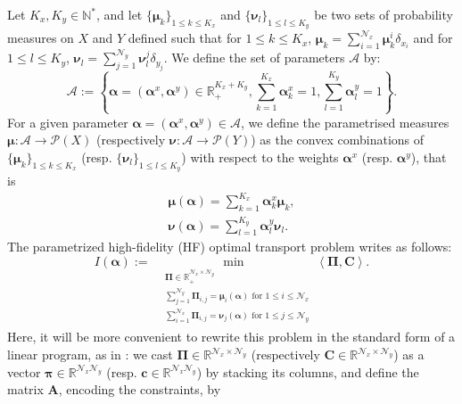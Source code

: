 \documentclass{article}
\def\RR{\mathbb{R}}
\def\N{\mathbb{N}}
\def\cA{\mathcal{A}}
\def\cN{\mathcal{N}}
\def\aalpha{\boldsymbol{\alpha}}
\def\ppi{\boldsymbol{\pi}}
\def\PPi{\boldsymbol{\Pi}}
\def\mmu{\boldsymbol{\mu}}
\def\nnu{\boldsymbol{\nu}}
\def\cc{\mathbf{c}}
\def\AA{\mathbf{A}}
\def\CC{\mathbf{C}}
\begin{document}
Let $K_x, K_y \in \N^*$, and let $\displaystyle{}\{\mmu_{k}\}_{1 \leq k \leq K_x}$ and  $\displaystyle{}\{\nnu_{l}\}_{1 \leq l \leq K_y}$ be two sets of probability measures on $X$ and $Y$ defined such that for $1\leq k \leq K_x$, $\displaystyle{} \mmu_{k} = \sum_{i = 1}^{\cN_x} \mmu_{k}^i \delta_{x_i}$ and for $1\leq l \leq K_y$, $\displaystyle{}\nnu_{l} = \sum_{j = 1}^{\cN_y} \nnu_{l}^j \delta_{y_j}$.
We define the set of parameters $\cA$ by:
%
\begin{equation}
    \cA := \left\lbrace \aalpha = (\aalpha^{x}, \aalpha^{y}) \in \RR_+^{K_x+ K_y}, \sum_{ k = 1}^{K_x}\aalpha_{k}^x = 1, \sum_{l = 1}^{K_y}\aalpha_{l}^y = 1 \right\rbrace.
\end{equation}
%
For a given parameter $\aalpha = (\aalpha^x, \aalpha^y) \in \cA$, we define the parametrised measures $\mmu:\cA\to\mathcal P(X)$ (respectively $\nnu:\cA\to\mathcal P(Y)$) as the convex combinations of $\{\mmu_{k}\}_{1 \leq k \leq K_x}$ (resp.  $\{\nnu_{l}\}_{1 \leq l \leq K_y}$) with respect to the weights $\aalpha^x$ (resp. $\aalpha^y$), that is
%
\begin{equation}
    \begin{array}{cc}
        \displaystyle{} \mmu(\aalpha) = \sum_{k = 1}^{K_x} \aalpha^x_{k} \mmu_{k},  \\
         \displaystyle \nnu(\aalpha) = \sum_{l= 1}^{K_y} \aalpha^y_{l} \nnu_{l}. 
    \end{array}
\end{equation}
% 
The parametrized high-fidelity (HF) optimal transport problem writes as follows:
%
\begin{equation}\label{eq: primal matrix}
\displaystyle  I(\aalpha):= \mathop{\min}_{\begin{array}{cc}
&\PPi \in \RR_+^{\cN_x \times \cN_y} \\
&\displaystyle \sum_{j = 1}^{\cN_y} \PPi_{i,j} = \mmu_i(\aalpha) \text{ for } 1\leq i \leq \cN_x \\
&\displaystyle \sum_{i = 1}^{\cN_x} \PPi_{i,j} = \nnu_j(\aalpha) \text{ for } 1\leq j \leq \cN_y \\
\end{array}
}
\left\langle \PPi, \CC \right\rangle .
\end{equation}
%
Here, it will  be more convenient to rewrite this problem in the standard form  of  a
linear program, as in \cite{COTFNT}: we cast $\PPi \in \RR^{\cN_x \times \cN_y}$ (respectively $\CC\in \RR^{\cN_x \times \cN_y}$) as a vector $\ppi\in {\RR^{\cN_x \cN_y}}$ (resp. $\cc\in \RR^{\cN_x\cN_y}$) by stacking its columns, and define the matrix $\AA$, encoding the constraints, by
\end{document}
